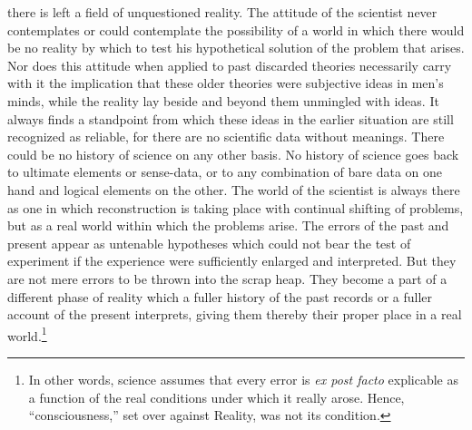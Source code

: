 \documentclass[12pt]{article}
\begin{document}
there is left a field of unquestioned reality. The attitude
of the scientist never contemplates or could contemplate
the possibility of a world in which there
would be no reality by which to test his hypothetical
solution of the problem that arises. Nor does this
attitude when applied to past discarded theories necessarily
carry with it the implication that these older
theories were subjective ideas in men's minds, while
the reality lay beside and beyond them unmingled with
ideas. It always finds a standpoint from which these
ideas in the earlier situation are still recognized as
reliable, for there are no scientific data without meanings.
There could be no history of science on any other
basis. No history of science goes back to ultimate elements
or sense-data, or to any combination of bare data
on one hand and logical elements on the other. The
world of the scientist is always there as one in which
reconstruction is taking place with continual shifting
of problems, but as a real world within which the problems
arise. The errors of the past and present appear
as untenable hypotheses which could not bear the test
of experiment if the experience were sufficiently enlarged
and interpreted. But they are not mere errors
to be thrown into the scrap heap. They become a part
of a different phase of reality which a fuller history
of the past records or a fuller account of the present
interprets, giving them thereby their proper place in
a real world.\footnote{In other words, science assumes that every error is \emph{ex post facto} explicable as a function of the real conditions under which it really arose. Hence, ``consciousness,'' set over against Reality, was not its condition.}
\end{document}
